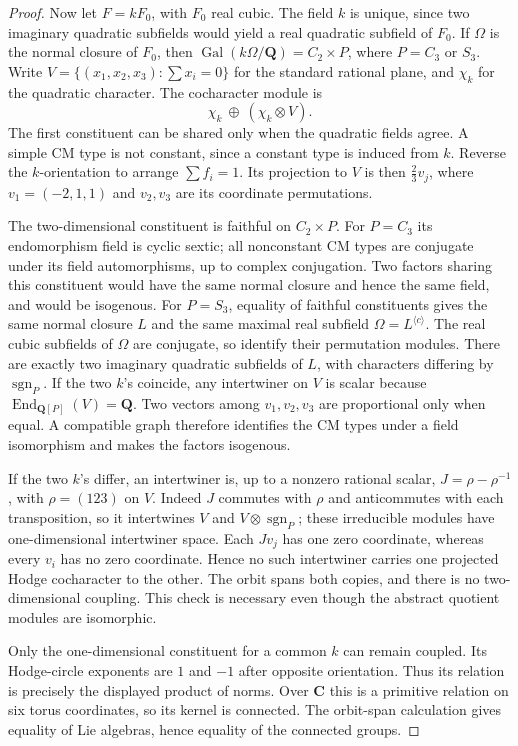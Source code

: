 \documentclass[11pt,reqno]{article}
\theoremstyle{emphasizedplain}
\theoremstyle{emphasizeddefinition}
\theoremstyle{emphasizeddefinition}
\DeclareMathOperator{\End}{End}
\newcommand{\Q}{\mathbf Q}
\newcommand{\C}{\mathbf C}
\begin{document}
\begin{proof}
Now let $F=kF_0$, with $F_0$ real cubic. The field $k$ is unique,
since two imaginary quadratic subfields would yield a real quadratic
subfield of $F_0$. If $\Omega$ is the normal closure of $F_0$, then
$\operatorname{Gal}(k\Omega/\Q)=C_2\times P$, where
$P=C_3$ or $S_3$. Write $V=\{(x_1,x_2,x_3):\sum x_i=0\}$ for the
standard rational plane, and $\chi_k$ for the quadratic character.
The cocharacter module is
\[
 \chi_k\ \oplus\ (\chi_k\otimes V).
\]
The first constituent can be shared only when the quadratic fields
agree. A simple CM type is not constant, since a constant type is
induced from $k$. Reverse the $k$-orientation to arrange $\sum f_i=1$.
Its projection to $V$ is then $\frac23 v_j$, where
$v_1=(-2,1,1)$ and $v_2,v_3$ are its coordinate permutations.

The two-dimensional constituent is faithful on $C_2\times P$.
For $P=C_3$ its endomorphism field is cyclic sextic; all nonconstant
CM types are conjugate under its field automorphisms, up to complex
conjugation. Two factors sharing this constituent would have the same
normal closure and hence the same field, and would be isogenous.
For $P=S_3$, equality of faithful constituents gives the same normal
closure $L$ and the same maximal real subfield $\Omega=L^{\langle c\rangle}$.
The real cubic subfields of $\Omega$ are conjugate, so identify their
permutation modules. There are exactly two imaginary quadratic
subfields of $L$, with characters differing by $\operatorname{sgn}_P$.
If the two $k$'s coincide, any intertwiner on $V$ is scalar because
$\End_{\Q[P]}(V)=\Q$. Two vectors among $v_1,v_2,v_3$ are proportional
only when equal. A compatible graph therefore identifies the CM types
under a field isomorphism and makes the factors isogenous.

If the two $k$'s differ, an intertwiner is, up to a nonzero rational
scalar, $J=\rho-\rho^{-1}$, with $\rho=(123)$ on $V$.
Indeed $J$ commutes with $\rho$ and anticommutes with each
transposition, so it intertwines $V$ and $V\otimes\operatorname{sgn}_P$;
these irreducible modules have one-dimensional intertwiner space.
Each $Jv_j$ has one zero coordinate, whereas every $v_i$ has no zero
coordinate. Hence no such intertwiner carries one projected Hodge
cocharacter to the other. The orbit spans both copies, and there is
no two-dimensional coupling. This check is necessary even though the
abstract quotient modules are isomorphic.

Only the one-dimensional constituent for a common $k$ can remain
coupled. Its Hodge-circle exponents are $1$ and $-1$ after opposite
orientation. Thus its relation is precisely the displayed product of
norms. Over $\C$ this is a primitive relation on six torus coordinates,
so its kernel is connected. The orbit-span calculation gives equality
of Lie algebras, hence equality of the connected groups.
\end{proof}
\end{document}
